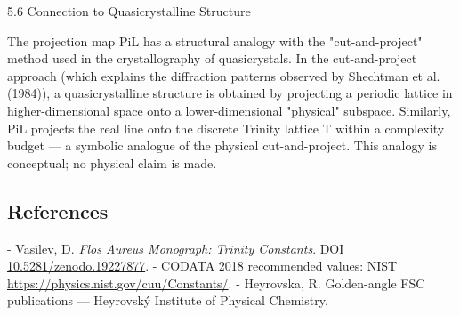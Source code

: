   5.6 Connection to Quasicrystalline Structure

  The projection map PiL has a structural analogy with the "cut-and-project" method used
  in the crystallography of quasicrystals. In the cut-and-project approach (which explains
  the diffraction patterns observed by Shechtman et al. (1984)), a quasicrystalline
  structure is obtained by projecting a periodic lattice in higher-dimensional space onto a
  lower-dimensional "physical" subspace. Similarly, PiL projects the real line onto the
  discrete Trinity lattice T within a complexity budget --- a symbolic analogue of the
  physical cut-and-project. This analogy is conceptual; no physical claim is made.

\subsection{References}

- Vasilev, D. \textit{Flos Aureus Monograph: Trinity Constants}. DOI \href{https://zenodo.org/doi/10.5281/zenodo.19227877}{10.5281/zenodo.19227877}.
- CODATA 2018 recommended values: NIST \href{https://physics.nist.gov/cuu/Constants/}{https://physics.nist.gov/cuu/Constants/}.
- Heyrovska, R. Golden-angle FSC publications --- Heyrovský Institute of Physical Chemistry.
